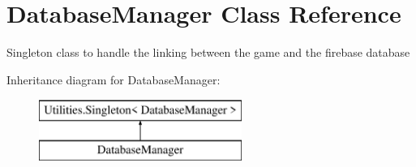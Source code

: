 \hypertarget{class_database_manager}{}\section{Database\+Manager Class Reference}
\label{class_database_manager}


Singleton class to handle the linking between the game and the firebase database  


Inheritance diagram for Database\+Manager\+:\begin{figure}[H]
\begin{center}
\leavevmode
\includegraphics[height=2.000000cm]{class_database_manager}
\end{center}
\end{figure}
